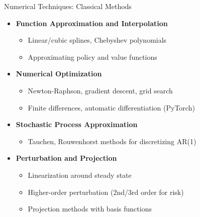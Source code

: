 \begin{frame}{Numerical Techniques: Classical Methods}
\begin{itemize}
\item \textbf{Function Approximation and Interpolation}
\begin{itemize}
    \item Linear/cubic splines, Chebyshev polynomials
    \item Approximating policy and value functions
\end{itemize}

\medskip
\item \textbf{Numerical Optimization}
\begin{itemize}
    \item Newton-Raphson, gradient descent, grid search
    \item Finite differences, automatic differentiation (PyTorch)
\end{itemize}

\medskip
\item \textbf{Stochastic Process Approximation}
\begin{itemize}
    \item Tauchen, Rouwenhorst methods for discretizing AR(1)
\end{itemize}

\medskip
\item \textbf{Perturbation and Projection}
\begin{itemize}
    \item Linearization around steady state
    \item Higher-order perturbation (2nd/3rd order for risk)
    \item Projection methods with basis functions
\end{itemize}
\end{itemize}
\end{frame}

